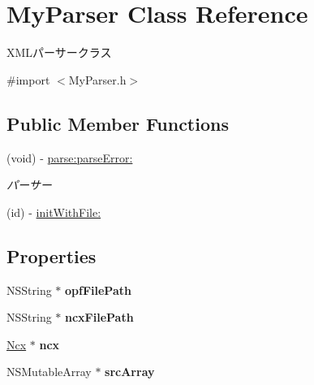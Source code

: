 \hypertarget{interface_my_parser}{\section{My\-Parser Class Reference}
\label{interface_my_parser}
}


X\-M\-Lパーサークラス  




{\ttfamily \#import $<$My\-Parser.\-h$>$}

\subsection*{Public Member Functions}
\begin{DoxyCompactItemize}
\item 
(void) -\/ \hyperlink{interface_my_parser_ade59554e3e96826c2b91294d3492cd5b}{parse\-:parse\-Error\-:}
\begin{DoxyCompactList}\small\item\em パーサー \end{DoxyCompactList}\item 
(id) -\/ \hyperlink{interface_my_parser_a829b350f3550cbc0799d1be8da825a5a}{init\-With\-File\-:}
\end{DoxyCompactItemize}
\subsection*{Properties}
\begin{DoxyCompactItemize}
\item 
\hypertarget{interface_my_parser_a7c541ef5a3b76415560650f9d43ec4ba}{N\-S\-String $\ast$ {\bfseries opf\-File\-Path}}\label{interface_my_parser_a7c541ef5a3b76415560650f9d43ec4ba}

\item 
\hypertarget{interface_my_parser_ad6d6d94fc73e5fea4a7db715e0519ca2}{N\-S\-String $\ast$ {\bfseries ncx\-File\-Path}}\label{interface_my_parser_ad6d6d94fc73e5fea4a7db715e0519ca2}

\item 
\hypertarget{interface_my_parser_a2c5a2283820097aac37c3d55fc40497f}{\hyperlink{interface_ncx}{Ncx} $\ast$ {\bfseries ncx}}\label{interface_my_parser_a2c5a2283820097aac37c3d55fc40497f}

\item 
\hypertarget{interface_my_parser_a8a4ea22b32d9ee9ee614c447c86e220b}{N\-S\-Mutable\-Array $\ast$ {\bfseries src\-Array}}\label{interface_my_parser_a8a4ea22b32d9ee9ee614c447c86e220b}

\end{DoxyCompactItemize}



